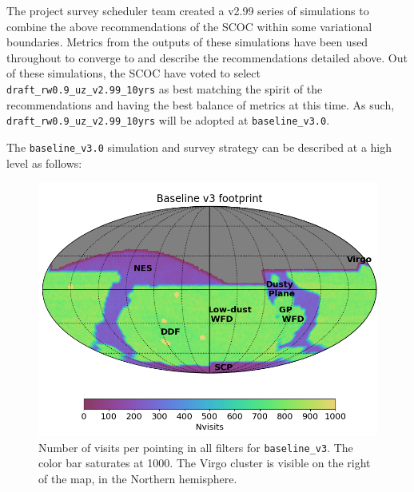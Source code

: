 The project survey scheduler team created a v2.99 series of simulations to combine the above recommendations of the SCOC within some variational boundaries. Metrics from the outputs of these simulations have been used throughout to converge to and describe the recommendations detailed above. Out of these simulations, the SCOC have voted to select \texttt{draft\_rw0.9\_uz\_v2.99\_10yrs} as best matching the spirit of the recommendations and having the best balance of metrics at this time. As such, \texttt{draft\_rw0.9\_uz\_v2.99\_10yrs} will be adopted at \texttt{baseline\_v3.0}. 



The \texttt{baseline\_v3.0} simulation and survey strategy can be described at a high level as follows:
\begin{figure}[h!]
    \centering
    \includegraphics[width=4.7in]{figures/v3footprint.png}
    \caption{Number of visits per pointing in all filters for \texttt{baseline\_v3}. The color bar saturates at 1000. The Virgo cluster is visible on the right of the map, in the Northern hemisphere.%
    }\label{fig:baselinev3Footprint}
\end{figure}



